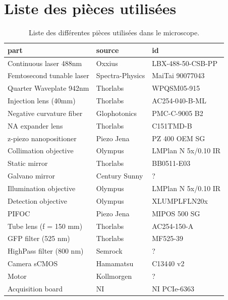 \chapter{Liste des pièces utilisées}\label{AppApartlist}

\begin{table}[h!]
    \centering
    \begin{tabular}{|l|l|l|}
        \hline
        \textbf{part} & \textbf{source} & \textbf{id}\\
        \hline
        Continuous laser 488nm & Oxxius & LBX-488-50-CSB-PP\\
        Femtosecond tunable laser & Spectra-Physics & MaiTai 90077043\\
        Quarter Waveplate 942nm & Thorlabs & WPQSM05-915\\
        Injection lens (40mm) & Thorlabs & AC254-040-B-ML\\
        Negative curvature fiber & Glophotonics & PMC-C-9005 B2\\
        NA expander lens & Thorlabs & C151TMD-B\\
        z-piezo nanopositioner & Piezo Jena & PZ 400 OEM SG\\
        Collimation objective & Olympus & LMPlan N 5x/0.10 IR\\
        Static mirror & Thorlabs & BB0511-E03\\
        Galvano mirror & Century Sunny & ?\\
        Illumination objective & Olympus & LMPlan N 5x/0.10 IR\\
        Detection objective & Olympus & XLUMPLFLN20x\\
        PIFOC & Piezo Jena & MIPOS 500 SG\\
        Tube lens (f = 150 mm) & Thorlabs & AC254-150-A\\
        GFP filter (525 nm) & Thorlabs & MF525-39\\
        HighPass filter (800 nm) & Semrock & ?\\
        Camera sCMOS & Hamamatsu & C13440 v2\\
        Motor & Kollmorgen & ?\\
        Acquisition board & NI & NI PCIe-6363\\
        \hline
    \end{tabular}
    \caption{Liste des différentes pièces utilisées dans le microscope.}
\end{table}
